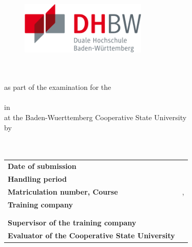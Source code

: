 
\thispagestyle{empty}
{
	\begin{titlepage}
		\enlargethispage{4cm}
		\begin{figure}
			\begin{minipage}{0.49\textwidth}
				\flushleft
			\end{minipage}
			\hfill
			\begin{minipage}{0.49\textwidth}
				\flushright
				\includegraphics[height=2.5cm]{images/logos/dhbw.pdf} 
			\end{minipage}
		\end{figure} 
		\vspace*{0.1cm}
		\begin{center}
			\huge{\textbf{\titel}}\\[1.5cm]
			\Large{\textbf{\arbeit}}\\[0.5cm]
			\normalsize{as part of the examination for the\\[1ex] \textbf{\abschluss}}\\[0.5cm]
			\Large{in \studiengang}\\[1ex]
			\normalsize{at the Baden-Wuerttemberg Cooperative State University \abgabeOrt}\\[1cm]
			\normalsize{by}\\[1ex] \Large{\textbf{\vorname\,\nachname}} \\[1cm]
			\normalsize{\bearbeitungsmonat}\\[2.25cm]
			\begin{spacing}{0.8}
				\begin{tabular}{ll}
					\textbf{Date of submission}				\hspace{4.5cm}					& \abgabeDatum\\[0.2cm]
					\textbf{Handling period}       				&  \bearbeitungszeitraum\\[0.2cm]
					\textbf{Matriculation number, Course}	   	&  \matrikelnr, \kurs\\[0.2cm]
					\textbf{Training company}              					 &  \firmaName\\
																							& \firmaStrasse \\
																							& \firmaPlz\\[0.2cm]
					\textbf{Supervisor of the training company}          &  \betreuerFirma\\[0.2cm]
					\textbf{Evaluator of the  Cooperative State University}    &  \betreuerDhbw\\[0.2cm]
				\end{tabular} 
			\end{spacing}
		\end{center}
	\end{titlepage}
}
